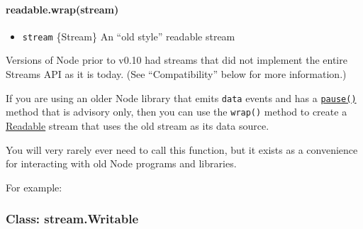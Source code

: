 \paragraph{readable.wrap(stream)}\label{readable.wrapstream}

\begin{itemize}
\itemsep1pt\parskip0pt
\item
  \texttt{stream} \{Stream\} An ``old style'' readable stream
\end{itemize}

Versions of Node prior to v0.10 had streams that did not implement the
entire Streams API as it is today. (See ``Compatibility'' below for more
information.)

If you are using an older Node library that emits
\texttt{\textquotesingle{}data\textquotesingle{}} events and has a
\hyperref[streamux5freadableux5fpause]{\texttt{pause()}} method that is
advisory only, then you can use the \texttt{wrap()} method to create a
\hyperref[streamux5fclassux5fstreamux5freadable]{Readable} stream that
uses the old stream as its data source.

You will very rarely ever need to call this function, but it exists as a
convenience for interacting with old Node programs and libraries.

For example:

\begin{Shaded}
\begin{Highlighting}[]
 \NormalTok{(}\NormalTok{;}
  
 \NormalTok{(}\NormalTok{;}
  

\NormalTok{(}\NormalTok{, }\NormalTok{() \{}
  \NormalTok{(); }
\NormalTok{\});}
\end{Highlighting}
\end{Shaded}

\subsubsection{Class: stream.Writable}\label{class-stream.writable}

